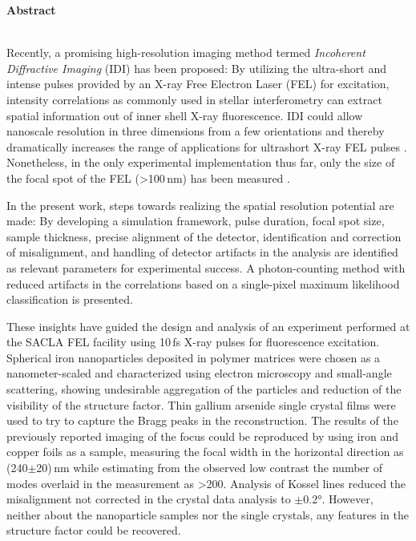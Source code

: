 	\begin{Huge}
		\textbf{Abstract}\vspace{12mm}
	\end{Huge}
\\
Recently, a promising high-resolution imaging method termed \textit{Incoherent Diffractive Imaging} (IDI) has been proposed: By utilizing the ultra-short and intense pulses provided by an X-ray Free Electron Laser (FEL) for excitation,  intensity correlations as commonly used in stellar interferometry can extract spatial information out of inner shell X-ray fluorescence.  IDI could allow nanoscale resolution in three dimensions from a few orientations and thereby dramatically increases the range of applications for ultrashort X-ray FEL pulses \cite{classen2017}. Nonetheless, in the only experimental implementation thus far, only the size of the focal spot of the FEL (>100\,nm) has been measured \cite{nakumura2020}.

In the present work, steps towards realizing the spatial resolution potential are made: By developing a simulation framework, pulse duration, focal spot size, sample thickness, precise alignment of the detector, identification and correction of misalignment, and handling of detector artifacts in the analysis are identified as relevant parameters for experimental success. A photon-counting method with reduced artifacts in the correlations based on a single-pixel maximum likelihood classification is presented.

These insights have guided the design and analysis of an experiment performed at the SACLA FEL facility using 10\,fs X-ray pulses for fluorescence excitation.
Spherical iron nanoparticles deposited in polymer matrices were chosen as a nanometer-scaled and characterized using electron microscopy and small-angle scattering, showing undesirable aggregation of the particles and reduction of the visibility of the structure factor. Thin gallium arsenide single crystal films were used to try to capture the Bragg peaks in the reconstruction. 
The results of the previously reported imaging of the focus could be reproduced by using iron and copper foils as a sample, measuring the focal width in the horizontal direction as (240$\pm$20)\,nm while estimating from the observed low contrast the number of modes overlaid in the measurement as >200. Analysis of Kossel lines reduced the misalignment not corrected in the crystal data analysis to $\pm$0.2°. However, neither about the nanoparticle samples nor the single crystals, any features in the structure factor could be recovered.

